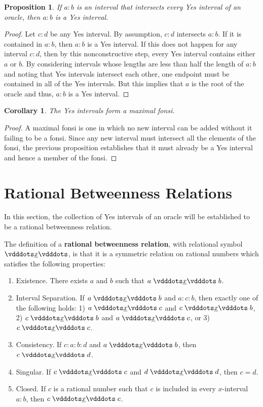 \documentclass[12pt]{article}
\newtheorem{corollary}{Corollary}[section]
\newtheorem{proposition}{Proposition}[section]
\begin{document}
\begin{proposition}
    If $a:b$ is an interval that intersects every Yes interval of an oracle, then $a:b$ is a Yes interval. 
\end{proposition}

\begin{proof}
    Let $c:d$ be any Yes interval. By assumption, $c:d$ intersects $a:b$. If it is contained in $a:b$, then $a:b$ is a Yes interval. If this does not happen for any interval $c:d$, then by this nonconstructive step, every Yes interval contains either $a$ or $b$. By considering intervals whose lengths are less than half the length of $a:b$ and noting that Yes intervals intersect each other, one endpoint must be contained in all of the Yes intervals. But this implies that $a$ is the root of the oracle and thus, $a:b$ is a Yes interval. 
\end{proof}

\begin{corollary}
    The Yes intervals form a maximal fonsi.
\end{corollary}

\begin{proof}
A maximal fonsi is one in which no new interval can be added without it failing to be a fonsi. Since any new interval must intersect all the elements of the fonsi, the previous proposition establishes that it must already be a Yes interval and hence a member of the fonsi. 
\end{proof}


\section{Rational Betweenness Relations}

In this section, the collection of Yes intervals of an oracle will be established to be a rational betweenness relation. 

The definition of a \textbf{rational betweenness relation}, with relational symbol $\xrel$, is that it is a symmetric relation on rational numbers which satisfies the following properties:
\begin{enumerate}
    \item Existence. There exists $a$ and $b$ such that $a\xrel b$.
    \item Interval Separation. If $a \xrel b$ and $a : c : b$, then exactly one of the following holds: 1) $a \xrel c$ and \sout{$c \xrel b$}, 2) $c \xrel b$ and \sout{$a \xrel c$}, or 3) $c \xrel c$. 
    \item Consistency. If $c : a : b : d$ and $a \xrel b$, then $c \xrel d$. 
    \item Singular. If $c \xrel c$ and $d \xrel d$, then $c=d$. 
    \item Closed. If $c$ is a rational number such that $c$ is included in every $x$-interval $a:b$, then  $c \xrel c$. 
\end{enumerate}
\end{document}
